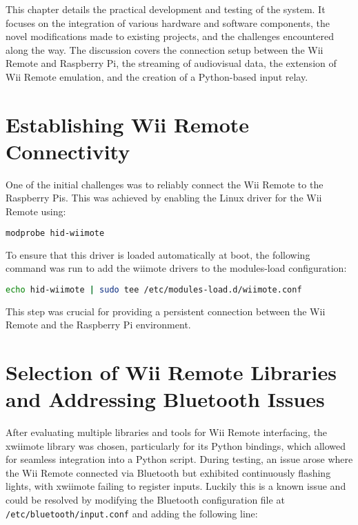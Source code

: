 \label{chapter:implemntation}

This chapter details the practical development and testing of the system. It focuses on the integration of various hardware and software components, the novel modifications made to existing projects, and the challenges encountered along the way. The discussion covers the connection setup between the Wii Remote and Raspberry Pi, the streaming of audiovisual data, the extension of Wii Remote emulation, and the creation of a Python-based input relay.

\section{Establishing Wii Remote Connectivity}

One of the initial challenges was to reliably connect the Wii Remote to the Raspberry Pis. This was achieved by enabling the Linux driver for the Wii Remote using:

\begin{lstlisting}[language=bash]
modprobe hid-wiimote
\end{lstlisting}

To ensure that this driver is loaded automatically at boot, the following command was run to add the wiimote drivers to the modules-load configuration:

\begin{lstlisting}[language=bash]
echo hid-wiimote | sudo tee /etc/modules-load.d/wiimote.conf
\end{lstlisting}

This step was crucial for providing a persistent connection between the Wii Remote and the Raspberry Pi environment.

\section{Selection of Wii Remote Libraries and Addressing Bluetooth Issues}

After evaluating multiple libraries and tools for Wii Remote interfacing, the xwiimote\cite{xwiimote} library was chosen, particularly for its Python bindings\cite{xwiimote_bindings}, which allowed for seamless integration into a Python script. During testing, an issue arose where the Wii Remote connected via Bluetooth but exhibited continuously flashing lights, with xwiimote failing to register inputs. Luckily this is a known issue\cite{xwiimote_issue} and could be resolved by modifying the Bluetooth configuration file at \texttt{/etc/bluetooth/input.conf} and adding the following line:

